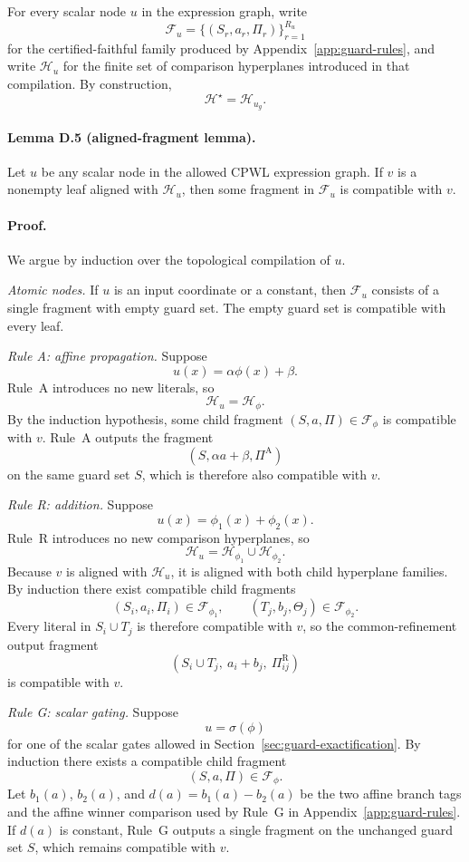 For every scalar node $u$ in the expression graph, write
\[
 \mathcal F_u=\{(S_r,a_r,\Pi_r)\}_{r=1}^{R_u}
\]
for the certified-faithful family produced by Appendix~\ref{app:guard-rules}, and write $\mathcal H_u$ for the finite set of comparison hyperplanes introduced in that compilation. By construction,
\[
 \mathcal H^\star=\mathcal H_{u_g}.
\]

\paragraph{Lemma D.5 (aligned-fragment lemma).}
Let $u$ be any scalar node in the allowed CPWL expression graph. If $v$ is a nonempty leaf aligned with $\mathcal H_u$, then some fragment in $\mathcal F_u$ is compatible with $v$.

\paragraph{Proof.}
We argue by induction over the topological compilation of $u$.

\emph{Atomic nodes.}
If $u$ is an input coordinate or a constant, then $\mathcal F_u$ consists of a single fragment with empty guard set. The empty guard set is compatible with every leaf.

\emph{Rule A: affine propagation.}
Suppose
\[
 u(x)=\alpha\phi(x)+\beta.
\]
Rule~A introduces no new literals, so
\[
 \mathcal H_u=\mathcal H_\phi.
\]
By the induction hypothesis, some child fragment $(S,a,\Pi)\in\mathcal F_\phi$ is compatible with $v$. Rule~A outputs the fragment
\[
 (S,\alpha a+\beta,\Pi^{\mathrm A})
\]
on the same guard set $S$, which is therefore also compatible with $v$.

\emph{Rule R: addition.}
Suppose
\[
 u(x)=\phi_1(x)+\phi_2(x).
\]
Rule~R introduces no new comparison hyperplanes, so
\[
 \mathcal H_u=\mathcal H_{\phi_1}\cup \mathcal H_{\phi_2}.
\]
Because $v$ is aligned with $\mathcal H_u$, it is aligned with both child hyperplane families. By induction there exist compatible child fragments
\[
 (S_i,a_i,\Pi_i)\in\mathcal F_{\phi_1},
 \qquad
 (T_j,b_j,\Theta_j)\in\mathcal F_{\phi_2}.
\]
Every literal in $S_i\cup T_j$ is therefore compatible with $v$, so the common-refinement output fragment
\[
 (S_i\cup T_j,\ a_i+b_j,\ \Pi^{\mathrm R}_{ij})
\]
is compatible with $v$.

\emph{Rule G: scalar gating.}
Suppose
\[
 u=\sigma(\phi)
\]
for one of the scalar gates allowed in Section~\ref{sec:guard-exactification}. By induction there exists a compatible child fragment
\[
 (S,a,\Pi)\in\mathcal F_\phi.
\]
Let $b_1(a)$, $b_2(a)$, and $d(a)=b_1(a)-b_2(a)$ be the two affine branch tags and the affine winner comparison used by Rule~G in Appendix~\ref{app:guard-rules}. If $d(a)$ is constant, Rule~G outputs a single fragment on the unchanged guard set $S$, which remains compatible with $v$.

